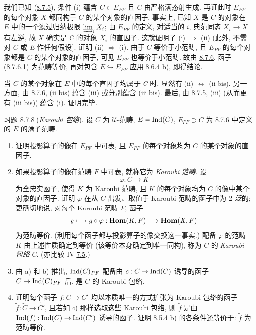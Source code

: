 我们\pageoriginale{}已知 (\hyperref[I.prop8.7.5]{8.7.5}), 条件 (i) 蕴含
$C\subset E_{PF}$ 且 $C$ 由严格满态射生成.
再证此时 $E_{PF}$ 的每个对象 $X$ 都同构于 $C$ 的某个对象的直因子.
事实上, 已知 $X$ 是 $C$ 的对象在 $E$ 中的一个滤过归纳极限 $\varinjlim_iX_i$;
由 $E_{PF}$ 的定义, 对适当的 $i$, 典范同态 $X_i\rightarrow X$ 有左逆,
故 $X$ 确实是 $C$ 的对象 $X_i$ 的直因子.
这就证明了 (i) $\Rightarrow$ (ii) (此外, 不需对 $C$ 或 $E$ 作任何假设).
证明 (ii) $\Rightarrow$ (i). 由于 $C$ 等价于小范畴,
且 $E_{PF}$ 的每个对象都是 $C$ 的某个对象的直因子,
可见 $E_{PF}$ 也等价于小范畴.
故由 \hyperref[I.cor8.7.6]{8.7.6}, 函子
\hyperlink{sga4.exp.I.equation.8.7.6.1}{(8.7.6.1)} 为范畴等价,
再对包含 $E\hookrightarrow E_{PF}$ 应用 \hyperref[I.prop8.6.4]{8.6.4} b), 即得结论.

当 $C$ 的某个对象在 $E$ 中的每个直因子均属于 $C$ 时,
显然有 (ii) $\Leftrightarrow$ (ii bis).
另一方面, 由 \hyperref[I.cor8.7.6]{8.7.6}, (ii bis) 蕴含 (iii) 或分别蕴含 (iii bis).
最后, 由 \hyperref[I.prop8.7.5]{8.7.5}, (iii)
(从而更有 (iii bis)) 蕴含 (i). 证明完毕.

\begin{enonce*}[remark]{习题 8.7.8}
(\emph{Karoubi 包络}). 设 $C$ 为 $𝒰$-范畴, $E=\operatorname{Ind}(C)$,
$E_{PF}\supset C$ 为 \hyperref[I.cor8.7.6]{8.7.6} 中定义的 $E$ 的满子范畴.
\begin{enumerate}
\renewcommand{\theenumi}{\alph{enumi}}
\renewcommand{\labelenumi}{\theenumi)}
\item 证明投影算子的像在 $E_{PF}$ 中可表,
且 $E_{PF}$ 的每个对象均为 $C$ 的某个对象的直因子.

\item 如果投影算子的像在范畴 $F$ 中可表, 就称它为 \emph{Karoubi 范畴}.
设
$$
\varphi:C\longrightarrow K
$$
为\pageoriginale{}全忠实函子, 使得 $K$ 为 Karoubi 范畴,
且 $K$ 的每个对象均为 $C$ 的像中某个对象的直因子.
证明 $\varphi$ 在从 $C$ 出发、取值于 Karoubi 范畴的函子中为 2-\emph{泛}的;
更确切地说, 对每个 Karoubi 范畴 $F$, 函子
$$
g\longmapsto g\circ \varphi :\operatorname{\mathbf{Hom}}(K,F)\longrightarrow \operatorname{\mathbf{Hom}}(K,F)
$$
为范畴等价. (利用每个函子都与投影算子的像交换这一事实.)
配备 $\varphi$ 的范畴 $K$ 由上述性质确定到等价
(该等价本身确定到唯一同构), 称为 $C$ 的 \emph{Karoubi 包络} $\widetilde C$.
(亦比较 IV \hyperref[I.cor7.5]{7.5}.)

\item 由 a) 和 b) 推出, $\operatorname{Ind}(C)_{PF}$ 配备由
$c:C\rightarrow\operatorname{Ind}(C)$ 诱导的函子 $C\rightarrow\operatorname{Ind}(C)_{PF}$ 后,
是 $C$ 的 Karoubi 包络.

\item 证明每个函子 $f:C\rightarrow C'$ 均以本质唯一的方式扩张为
Karoubi 包络的函子 $\widetilde f:\widetilde C\rightarrow\widetilde{C'}$,
且若如 c) 那样选取这些 Karoubi 包络, 则 $\widetilde f$ 是由
$\operatorname{Ind}(f):\operatorname{Ind}(C)\rightarrow\operatorname{Ind}(C')$ 诱导的函子.
证明 \hyperref[I.sec8.5.4]{8.5.4} %
b) %
的各条件还等价于: $\widetilde f$ 为范畴等价.
\end{enumerate}
\end{enonce*}

